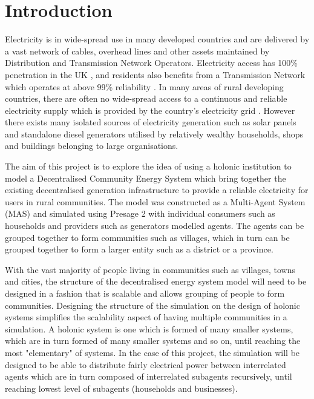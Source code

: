\chapter{Introduction}
\label{introduction}

Electricity is in wide-spread use in many developed countries and are delivered by a vast network of cables, overhead lines and other assets maintained by Distribution and Transmission Network Operators. Electricity access has 100\% penetration in the UK \cite{World-Bank-web:2015}, and residents also benefits from a Transmission Network which operates at above 99\% reliability \cite{NG-web:2015}. In many areas of rural developing countries, there are often no wide-spread access to a continuous and reliable electricity supply which is provided by the country's electricity grid \cite{IEA-web:2015}. However there exists many isolated sources of electricity generation such as solar panels and standalone diesel generators utilised by relatively wealthy households, shops and buildings belonging to large organisations. 

The aim of this project is to explore the idea of using a holonic institution to model a Decentralised Community Energy System which bring together the existing decentralised generation infrastructure to provide a reliable electricity for users in rural communities. The model was constructed as a Multi-Agent System (MAS) and simulated using Presage 2 with individual consumers such as households and providers such as generators modelled agents. The agents can be grouped together to form communities such as villages, which in turn can be grouped together to form a larger entity such as a district or a province. 

With the vast majority of people living in communities such as villages, towns and cities, the structure of the decentralised energy system model will need to be designed in a fashion that is scalable and allows grouping of people to form communities. Designing the structure of the simulation on the design of holonic systems simplifies the scalability aspect of having multiple communities in a simulation. A holonic system is one which is formed of many smaller systems, which are in turn formed of many smaller systems and so on, until reaching the most "elementary" of systems. In the case of this project, the simulation will be designed to be able to distribute fairly electrical power between interrelated agents which are in turn composed of interrelated subagents recursively, until reaching lowest level of subagents (households and businesses). 

